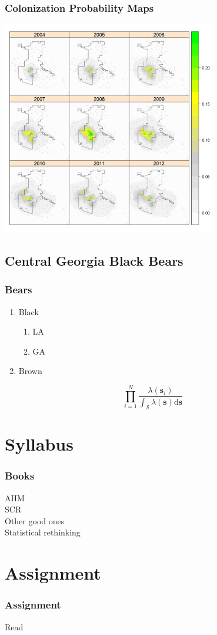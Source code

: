 \documentclass[color=usenames,dvipsnames]{beamer}\usepackage[]{graphicx}\usepackage[]{color}
\begin{document}
\begin{frame}
  \frametitle{Colonization Probability Maps}
  \begin{center}
    \includegraphics[width=0.7\textwidth]{figs/colMap1-9nohill}
  \end{center}
\end{frame}


\subsection{Central Georgia Black Bears}


\begin{frame}
  \frametitle{Bears}
  \begin{enumerate}
    \item Black
      \begin{enumerate}
        \item LA
        \item GA
      \end{enumerate}
    \item Brown
  \end{enumerate}
  \[
    \prod_{i=1}^N \frac{\lambda({\bm s}_i)}{\int_{\mathcal{S}} \lambda({\bm s}) \mathrm{d}{\bm s}}
  \]
\end{frame}







\section{Syllabus}




\begin{frame}
  \frametitle{Books}
  AHM \\
  SCR \\
  {\centering Other good ones \\}
  Statistical rethinking \\
\end{frame}



\section{Assignment}


\begin{frame}
  \frametitle{Assignment}
  Read
\end{frame}
\end{document}
